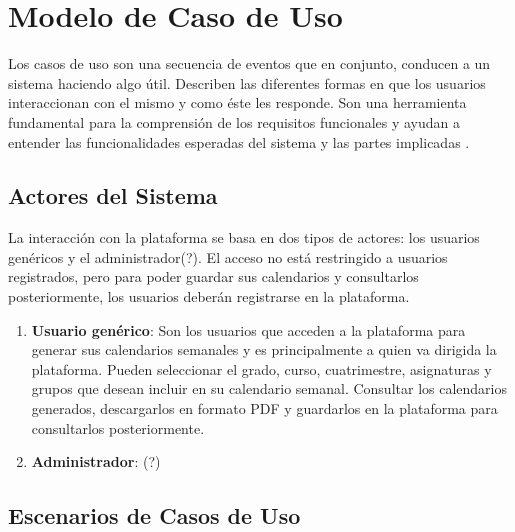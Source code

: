 \section{Modelo de Caso de Uso}

Los casos de uso son una secuencia de eventos que en conjunto, conducen a un sistema haciendo algo útil. Describen las diferentes formas en que los usuarios interaccionan con el mismo y como éste les responde. Son una herramienta fundamental para la comprensión de los requisitos funcionales y ayudan a entender las funcionalidades esperadas del sistema y las partes implicadas \cite{bittner2003use}.

\subsection{Actores del Sistema}

La interacción con la plataforma se basa en dos tipos de actores: los usuarios genéricos y el administrador(?). El acceso no está restringido a usuarios registrados, pero para poder guardar sus calendarios y consultarlos posteriormente, los usuarios deberán registrarse en la plataforma.

\begin{enumerate}
    \item \textbf{Usuario genérico}: Son los usuarios que acceden a la plataforma para generar sus calendarios semanales y es principalmente a quien va dirigida la plataforma. Pueden seleccionar el grado, curso, cuatrimestre, asignaturas y grupos que desean incluir en su calendario semanal. Consultar los calendarios generados, descargarlos en formato PDF y guardarlos en la plataforma para consultarlos posteriormente.
    \item \textbf{Administrador}: (?)
\end{enumerate}

\subsection{Escenarios de Casos de Uso}

\setcounter{ccCounter}{1}


